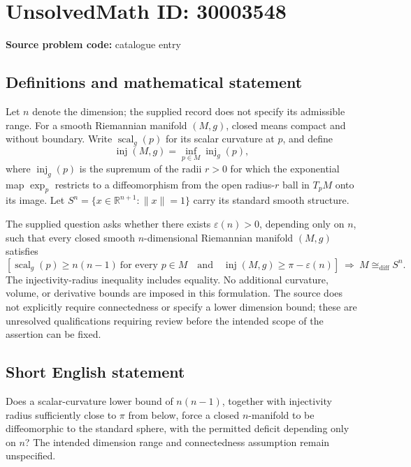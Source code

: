 \documentclass[11pt]{article}
\newcommand{\R}{\mathbb{R}}
\begin{document}
\section*{UnsolvedMath ID: 30003548}
\textbf{Source problem code:} catalogue entry
\subsection{Definitions and mathematical statement}
Let \(n\) denote the dimension; the supplied record does not specify its admissible range. For a smooth Riemannian manifold \((M,g)\), closed means compact and without boundary. Write \(\operatorname{scal}_g(p)\) for its scalar curvature at \(p\), and define
\[
\operatorname{inj}(M,g)=\inf_{p\in M}\operatorname{inj}_g(p),
\]
where \(\operatorname{inj}_g(p)\) is the supremum of the radii \(r>0\) for which the exponential map \(\exp_p\) restricts to a diffeomorphism from the open radius-\(r\) ball in \(T_pM\) onto its image. Let \(S^n=\{x\in\R^{n+1}:\lVert x\rVert=1\}\) carry its standard smooth structure.

The supplied question asks whether there exists \(\varepsilon(n)>0\), depending only on \(n\), such that every closed smooth \(n\)-dimensional Riemannian manifold \((M,g)\) satisfies
\[
\left[\operatorname{scal}_g(p)\ge n(n-1)\ \text{for every }p\in M
\quad\text{and}\quad
\operatorname{inj}(M,g)\ge\pi-\varepsilon(n)\right]
\ \Longrightarrow\ M\cong_{\mathrm{diff}}S^n.
\]
The injectivity-radius inequality includes equality. No additional curvature, volume, or derivative bounds are imposed in this formulation. The source does not explicitly require connectedness or specify a lower dimension bound; these are unresolved qualifications requiring review before the intended scope of the assertion can be fixed.
\subsection{Short English statement}
Does a scalar-curvature lower bound of \(n(n-1)\), together with injectivity radius sufficiently close to \(\pi\) from below, force a closed \(n\)-manifold to be diffeomorphic to the standard sphere, with the permitted deficit depending only on \(n\)? The intended dimension range and connectedness assumption remain unspecified.
\end{document}

